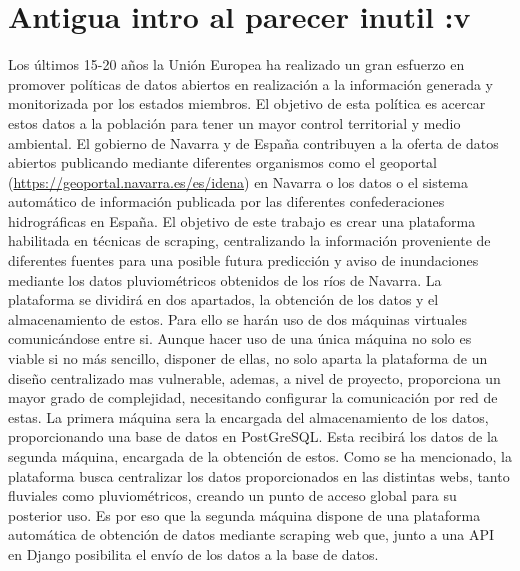 \section{Antigua intro al parecer inutil :v}
Los últimos 15-20 años la Unión Europea ha realizado un gran esfuerzo en promover políticas de datos abiertos en realización a la información generada y monitorizada por los estados miembros. El objetivo de esta política es acercar estos datos a la población para tener un mayor control territorial y medio ambiental. El gobierno de Navarra y de España contribuyen a la oferta de datos abiertos publicando mediante diferentes organismos como el geoportal (\url{https://geoportal.navarra.es/es/idena}) en Navarra o los datos o el sistema automático de información publicada por las diferentes confederaciones hidrográficas en España.\newline
\newline
El objetivo de este trabajo es crear una plataforma habilitada en técnicas de scraping, centralizando la información proveniente de diferentes fuentes para una posible futura predicción y aviso de inundaciones mediante los datos pluviométricos obtenidos de los ríos de Navarra.\newline
\newline
La plataforma se dividirá en dos apartados, la obtención de los datos y el almacenamiento de estos. Para ello se harán uso de dos máquinas virtuales comunicándose entre si. Aunque hacer uso de una única máquina no solo es viable si no más sencillo, disponer de ellas, no solo aparta la plataforma de un diseño centralizado mas vulnerable, ademas, a nivel de proyecto, proporciona un mayor grado de complejidad, necesitando configurar la comunicación por red de estas.\newline
\newline
La primera máquina sera la encargada del almacenamiento de los datos, proporcionando una base de datos en PostGreSQL. Esta recibirá los datos de la segunda máquina, encargada de la obtención de estos.\newline
\newline
Como se ha mencionado, la plataforma busca centralizar los datos proporcionados en las distintas webs, tanto fluviales como pluviométricos, creando un punto de acceso global para su posterior uso. Es por eso que la segunda máquina dispone de una plataforma automática de obtención de datos mediante scraping web que, junto a una API en Django posibilita el envío de los datos a la base de datos.\newline

